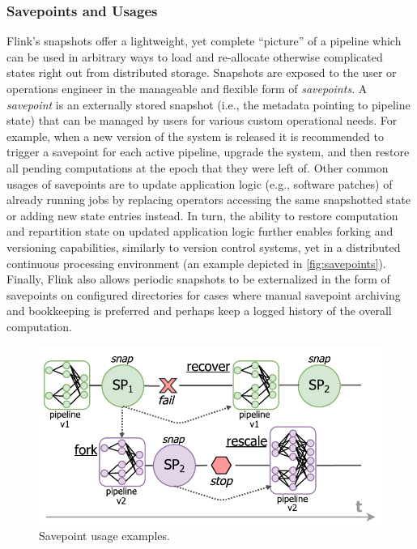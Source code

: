 \subsubsection{Savepoints and Usages}
\label{sec:savepoints}
Flink's snapshots offer a lightweight, yet complete ``picture'' of a pipeline which can be used in arbitrary ways to load and re-allocate otherwise complicated states right out from distributed storage. Snapshots are exposed to the user or operations engineer in the manageable and flexible form of \emph{savepoints}. A \emph{savepoint} is an externally stored snapshot (i.e., the metadata pointing to pipeline state) that can be managed by users for various custom operational needs. For example, when a new version of the system is released it is recommended to trigger a savepoint for each active pipeline, upgrade the system, and then restore all pending computations at the epoch that they were left of. Other common usages of savepoints are to update application logic (e.g., software patches) of already running jobs by replacing operators accessing the same snapshotted state or adding new state entries instead. In turn, the ability to restore computation and repartition state on updated application logic further enables forking and versioning capabilities, similarly to version control systems, yet in a distributed continuous processing environment (an example depicted in \autoref{fig:savepoints}). Finally, Flink also allows periodic snapshots to be externalized in the form of savepoints on configured directories for cases where manual savepoint archiving and bookkeeping is preferred and perhaps keep a logged history of the overall computation. 

\begin{figure}[h]
\centering
\includegraphics[width=\textwidth / 2]{figures/savepointsexamples.pdf}
\caption{Savepoint usage examples.} 
\label{fig:savepoints}
\vspace{-4mm}
\end{figure}

